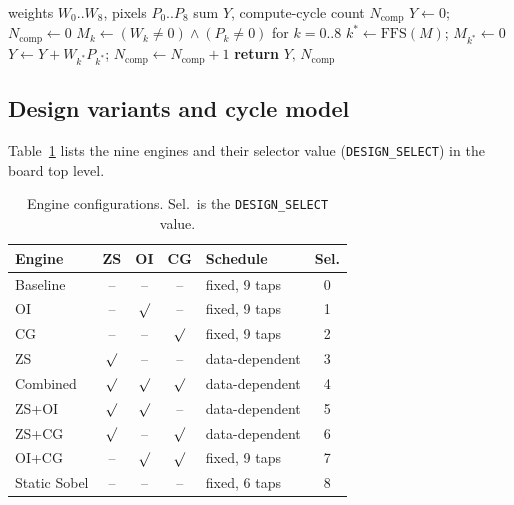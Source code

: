 \documentclass[11pt,journal,draftclsnofoot,onecolumn]{IEEEtran}
\begin{document}
\begin{algorithm}[t]
\caption{Zero-skipping convolution of one patch}
\label{alg:zs}
\begin{algorithmic}[1]
\Require weights $W_0..W_8$, pixels $P_0..P_8$
\Ensure sum $Y$, compute-cycle count $N_{\mathrm{comp}}$
\State $Y\gets0$;\; $N_{\mathrm{comp}}\gets0$
\State $M_k\gets(W_k\neq0)\wedge(P_k\neq0)$ for $k=0..8$
  \State $k^{*}\gets \mathrm{FFS}(M)$;\; $M_{k^{*}}\gets0$
  \State $Y\gets Y+W_{k^{*}}P_{k^{*}}$;\; $N_{\mathrm{comp}}\gets N_{\mathrm{comp}}+1$
\EndWhile
\State \textbf{return} $Y,\,N_{\mathrm{comp}}$
\end{algorithmic}
\end{algorithm}

\subsection{Design variants and cycle model}\label{sec:m-variants}
Table~\ref{tab:variants} lists the nine engines and their selector value
(\texttt{DESIGN\_SELECT}) in the board top level.

\begin{table}[t]
\centering
\caption{Engine configurations. Sel.\ is the \texttt{DESIGN\_SELECT} value.}
\label{tab:variants}
\small
\setlength{\tabcolsep}{8pt}
\begin{tabular}{lcccl c}
\toprule
\textbf{Engine} & \textbf{ZS} & \textbf{OI} & \textbf{CG} & \textbf{Schedule} & \textbf{Sel.}\\
\midrule
Baseline        & --      & --      & --      & fixed, 9 taps & 0\\
OI              & --      & $\surd$ & --      & fixed, 9 taps & 1\\
CG              & --      & --      & $\surd$ & fixed, 9 taps & 2\\
ZS              & $\surd$ & --      & --      & data-dependent & 3\\
Combined        & $\surd$ & $\surd$ & $\surd$ & data-dependent & 4\\
ZS+OI           & $\surd$ & $\surd$ & --      & data-dependent & 5\\
ZS+CG           & $\surd$ & --      & $\surd$ & data-dependent & 6\\
OI+CG           & --      & $\surd$ & $\surd$ & fixed, 9 taps & 7\\
Static Sobel    & --      & --      & --      & fixed, 6 taps & 8\\
\bottomrule
\end{tabular}
\end{table}
\end{document}

